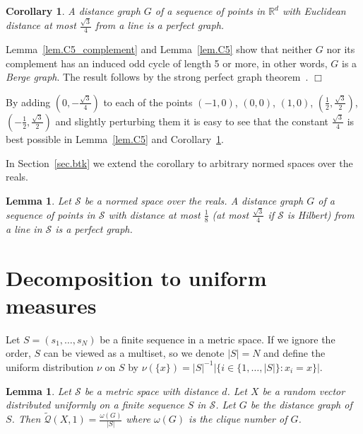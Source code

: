 \documentclass{article}
\newenvironment{proof}{\noindent{\bf Proof}}{\hspace*{\fill}$\Box$}
\newtheorem{lemma} [theorem] {Lemma}\newtheorem{attempt} [theorem] {Attempt}\newtheorem{corollary} [theorem] {Corollary}\newtheorem{prop} [theorem] {Proposition}\newtheorem{definition} [theorem] {Definition}\newtheorem{remark} [theorem] {Remark}\newtheorem{conjecture} [theorem] {Conjecture}\newtheorem{claim} [theorem] {Claim}
\newcommand{\concdiam}{\tilde{\mathcal{Q}}}
\begin{document}
\begin{corollary}\label{cor.perfect}
    A distance graph $G$ of a sequence of points in $\mathbb{R}^d$ with Euclidean distance at most $\frac {\sqrt 3} 4$
    from a line is a perfect graph.
\end{corollary}
\begin{proof}
    Lemma~\ref{lem.C5_complement}
    and Lemma~\ref{lem.C5} show that neither $G$ nor its complement has an induced
    odd cycle of length 5 or more, in other words, $G$ is a \emph{Berge graph}. The result follows by 
    the strong perfect graph theorem~\cite{strong_perfect}.
\end{proof}

\medskip

By adding $(0, -\frac{\sqrt 3} 4)$ to each of the points $(-1, 0)$, $(0,0)$, $(1,0)$, $(\frac 1 2, \frac {\sqrt 3} 2)$, $(-\frac 1 2, \frac {\sqrt 3} 2)$ and slightly perturbing them it is easy to see that the constant $\frac {\sqrt 3} 4$ is best possible in Lemma~\ref{lem.C5} and Corollary~\ref{cor.perfect}.

In Section~\ref{sec.btk} we extend the corollary to arbitrary normed spaces over the reals. 

\begin{lemma}\label{lem.perfect_gen}
    Let $\mathcal{S}$ be a normed space over the reals. A distance graph $G$ of a sequence of points in $\mathcal{S}$ with distance at most $\frac 1 8$ (at most $\frac {\sqrt 3} 4$ if $\mathcal{S}$ is Hilbert)
    from a line in $\mathcal{S}$ is a perfect graph.
\end{lemma}

\section{Decomposition to uniform measures}
\label{sec.decomposition}

Let $S = (s_1, \dots, s_N)$ be a finite sequence in a metric space. If we ignore the order, $S$ can be viewed as a multiset, so we denote $|S|=N$
and define the uniform distribution $\nu$ on $S$ by $\nu(\{x\}) = |S|^{-1} |\{i \in \{1,\dots,|S|\}: x_i = x\}|$.

\begin{lemma}\label{lem.cliques} 
    Let $\mathcal{S}$ be a metric space with distance $d$. Let $X$ be a random vector distributed uniformly on a finite sequence $S$ in $\mathcal{S}$. 
    Let $G$ be the distance graph of $S$. Then $\concdiam(X,1) = \frac {\omega(G)} {|S|}$ where $\omega(G)$ is the clique number of $G$.
\end{lemma}
\end{document}
